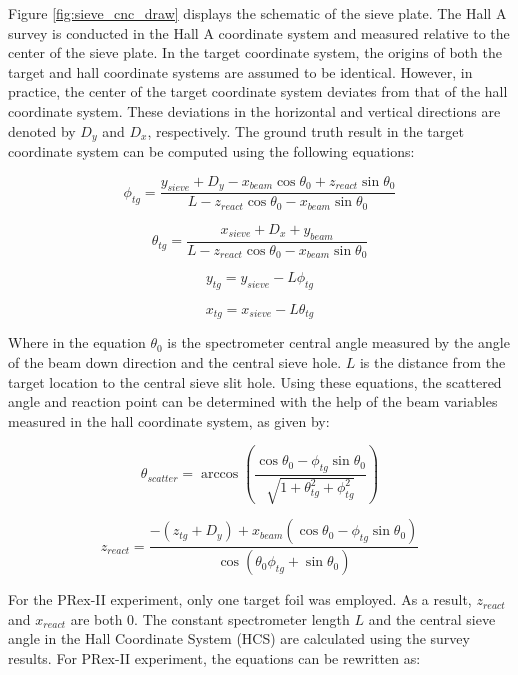 Figure \ref{fig:sieve_cnc_draw} displays the schematic of the sieve plate. The Hall A survey is conducted in the Hall A coordinate system and measured relative to the center of the sieve plate. In the target coordinate system, the origins of both the target and hall coordinate systems are assumed to be identical. However, in practice, the center of the target coordinate system deviates from that of the hall coordinate system. These deviations in the horizontal and vertical directions are denoted by $D_y$ and $D_x$, respectively. The ground truth result in the target coordinate system can be computed using the following equations:

\begin{equation}
\phi_{tg} = \frac{y_{sieve} + D_y - x_{beam}\cos{\theta_0} + z_{react}\sin{\theta_0}}{L - z_{react}\cos{\theta_0 - x_{beam}\sin{\theta_0}}}
\end{equation}

\begin{equation}
\theta_{tg} = \frac{x_{sieve} + D_x + y_{beam}}{L - z_{react}\cos{\theta_0} - x_{beam}\sin{\theta_0}}
\end{equation}

\begin{equation}
y_{tg} = y_{sieve} - L \phi_{tg}
\end{equation}

\begin{equation}
x_{tg} = x_{sieve} - L \theta_{tg}
\end{equation}

Where in the equation $\theta_0$ is the spectrometer central angle measured by the angle of the beam down direction and the central sieve hole. $L$ is the distance from the target location to the central sieve slit hole. Using these equations, the scattered angle and reaction point can be determined with the help of the beam variables measured in the hall coordinate system, as given by:

\begin{equation}
\theta_{scatter} = \arccos\left(\frac{\cos{\theta_0} - \phi_{tg}\sin{\theta_0}}{\sqrt{1 + \theta^2_{tg} + \phi^2_{tg}}}\right)
\end{equation}

\begin{equation}
z_{react} = \frac{-(z_{tg} + D_y) + x_{beam}(\cos{\theta_0} - \phi_{tg}\sin{\theta_0})}{\cos{(\theta_0\phi_{tg} + \sin{\theta_0})}}
\end{equation}

For the PRex-II experiment, only one target foil was employed. As a result, $z_{react}$ and $x_{react}$ are both 0. The constant spectrometer length $L$ and the central sieve angle in the Hall Coordinate System (HCS) are calculated using the survey results. For PRex-II experiment, the equations can be rewritten as:

